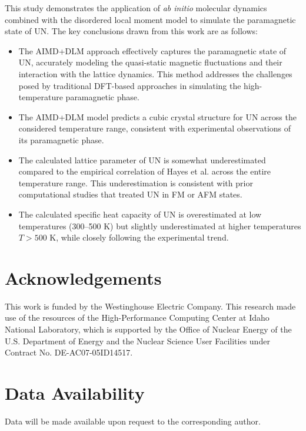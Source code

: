 \documentclass[preprint, 12pt]{elsarticle}
\newcommand{\?}{\stackrel{?}{=}}
\begin{document}
This study demonstrates the application of \textit{ab initio} molecular dynamics combined with the disordered local moment model to simulate the paramagnetic state of UN. The key conclusions drawn from this work are as follows:

\begin{itemize}
    \item The AIMD+DLM approach effectively captures the paramagnetic state of UN, accurately modeling the quasi-static magnetic fluctuations and their interaction with the lattice dynamics. This method addresses the challenges posed by traditional DFT-based approaches in simulating the high-temperature paramagnetic phase.

    \item The AIMD+DLM model predicts a cubic crystal structure for UN across the considered temperature range, consistent with experimental observations of its paramagnetic phase.
    
    \item The calculated lattice parameter of UN is somewhat underestimated compared to the empirical correlation of Hayes et al. across the entire temperature range. This underestimation is consistent with prior computational studies that treated UN in FM or AFM states.
    \item The calculated specific heat capacity of UN is overestimated at low temperatures (300–500 K) but slightly underestimated at higher temperatures $T > 500$ K, while closely following the experimental trend.

\end{itemize}

\FloatBarrier

\section{Acknowledgements}

This work is funded by the Westinghouse Electric Company. This research made use of the resources of the High-Performance Computing Center at Idaho National Laboratory, which is supported by the Office of Nuclear Energy of the U.S. Department of Energy and the Nuclear Science User Facilities under Contract No. DE-AC07-05ID14517. 

\section{Data Availability}

Data will be made available upon request to the corresponding author.



\end{document}
